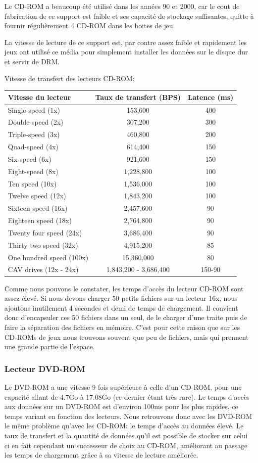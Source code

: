 \documentclass[a4paper, 11pt]{article} %
\begin{document}
Le CD-ROM a beaucoup été utilisé dans les années 90 et 2000, car le cout de fabrication de ce support est faible et ses capacité de stockage suffisantes, quitte à fournir régulièrement 4 CD-ROM dans les boites de jeu.

La vitesse de lecture de ce support est, par contre assez faible et rapidement les jeux ont utilisé ce média pour simplement installer les données sur le disque dur et servir de DRM.

\newpage
Vitesse de transfert des lecteurs CD-ROM: \cite{hardware:cdromspeed}

\begin{tabular}{|l|c|c|}
  \hline
  Vitesse du lecteur & Taux de transfert (BPS) & Latence (ms)\\
  \hline
  Single-speed (1x)&153,600&400\\
	Double-speed (2x)&307,200&300\\
	Triple-speed (3x)&460,800&200\\
	Quad-speed (4x)&614,400&150\\
	Six-speed (6x)&921,600&150\\
	Eight-speed (8x)&1,228,800&100\\
	Ten speed (10x)&1,536,000&100\\
	Twelve speed (12x)&1,843,200&100\\
	Sixteen speed (16x)&2,457,600&90\\
	Eighteen speed (18x)&2,764,800&90\\
	Twenty four speed (24x)&3,686,400&90\\
	Thirty two speed (32x)&4,915,200&85\\
	One hundred speed (100x)&15,360,000&80\\
	CAV drives (12x - 24x)&1,843,200 - 3,686,400&150-90\\
  \hline
\end{tabular}

Comme nous pouvons le constater, les temps d'accès du lecteur CD-ROM sont assez élevé. Si nous devons charger 50 petits fichiers sur un lecteur 16x, nous ajoutons inutilement 4 secondes et demi de temps de chargement. Il convient donc d'encapsuler ces 50 fichiers dans un seul, de le charger d'une traite puis de faire la séparation des fichiers en mémoire.
C'est pour cette raison que sur les CD-ROMs de jeux nous trouvons souvent que peu de fichiers, mais qui prennent une grande partie de l'espace.

\subsubsection*{Lecteur DVD-ROM}
Le DVD-ROM a une vitesse 9 fois supérieure à celle d'un CD-ROM,\cite{hardware:dvdromspeed} pour une capacité allant de 4.7Go à 17.08Go (ce dernier étant très rare). Le temps d'accès aux données sur un DVD-ROM est d'environ 100ms pour les plus rapides, ce temps variant en fonction des lecteurs. Nous retrouvons donc avec les DVD-ROM le même problème qu'avec les CD-ROM: le temps d'accès au données élevé. Le taux de transfert et la quantité de données qu'il est possible de stocker sur celui ci en fait cependant un successeur de choix au CD-ROM, améliorant au passage les temps de chargement grâce à sa vitesse de lecture améliorée.
\end{document}
